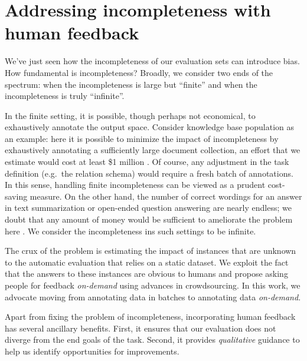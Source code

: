 
\section{Addressing incompleteness with human feedback}
We've just seen how the incompleteness of our evaluation sets can introduce bias.
How fundamental is incompleteness?
Broadly, we consider two ends of the spectrum: when the incompleteness is large but ``finite'' and when the incompleteness is truly ``infinite''.

In the finite setting, it is possible, though perhaps not economical, to exhaustively annotate the output space.
Consider knowledge base population as an example: here it is possible to minimize the impact of incompleteness by exhaustively annotating a sufficiently large document collection, an effort that we estimate would cost at least \$1 million .
Of course, any adjustment in the task definition (e.g.\ the relation schema) would require a fresh batch of annotations.
In this sense, handling finite incompleteness can be viewed as a prudent cost-saving measure.
On the other hand, the number of correct wordings for an answer in text summarization or open-ended question answering are nearly endless; we doubt that any amount of money would be sufficient to ameliorate the problem here .
We consider the incompleteness ins such settings to be infinite. 

The crux of the problem is estimating the impact of instances that are unknown to the automatic evaluation that relies on a static dataset.
We exploit the fact that the answers to these instances are obvious to humans and propose asking people for feedback \textit{on-demand} using advances in crowdsourcing.
In this work, we advocate moving from annotating data in batches to annotating data \textit{on-demand}.

Apart from fixing the problem of incompleteness, incorporating human feedback has several ancillary benefits.
First, it ensures that our evaluation does not diverge from the end goals of the task.
Second, it provides \textit{qualitative} guidance to help us identify opportunities for improvements.


